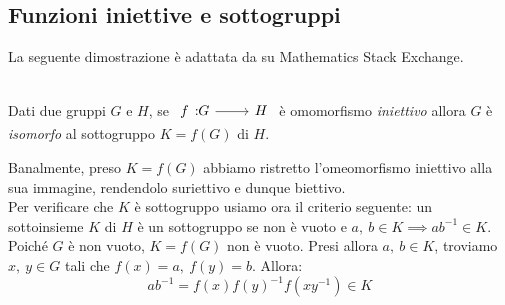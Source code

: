 \subsection{Funzioni iniettive e sottogruppi}\label{isomorfismosottogruppo}
La seguente dimostrazione è adattata da \cite{HagenVonEitzen:injectivesubgroup} su Mathematics Stack Exchange.
\begin{lemming}~{}\\
Dati due gruppi $G$ e $H$, se $\funz{f}{G}{H}$ è omomorfismo \textit{iniettivo} allora $G$ è \textit{isomorfo} al sottogruppo $K=f\left(G\right)$ di $H$.
\end{lemming}
\begin{demonstration}
	Banalmente, preso $K=f\left(G\right)$ abbiamo ristretto l'omeomorfismo iniettivo alla sua immagine, rendendolo suriettivo e dunque biettivo.\\
	Per verificare che $K$ è sottogruppo usiamo ora il criterio seguente: un sottoinsieme $K$ di $H$ è un sottogruppo se non è vuoto e $a,\ b\in K\implies ab^{-1}\in K$. Poiché $G$ è non vuoto, $K=f\left(G\right)$ non è vuoto. Presi allora $a,\ b\in K$, troviamo $x,\ y\in G$ tali che $f\left(x\right)=a,\ f\left(y\right)=b$. Allora:
	\begin{equation*}
		ab^{-1}=f\left(x\right)f\left(y\right)^{-1}f\left(xy^{-1}\right)\in K
	\end{equation*}
\vspace{-6mm}
\end{demonstration}
